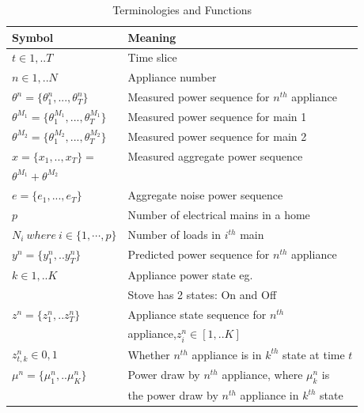 \documentclass[conference]{IEEEtran}
\begin{document}
\begin{table}[ht!]
\vspace{-12pt}
\caption{Terminologies and Functions}
\vspace{-8pt}
\label{tab:terms}
\begin{tabular}{|l|l|}
\hline
Symbol&Meaning\\
\hline
$t\in {1,..T}$& Time slice\\
\hline
$n\in{1,..N}$ & Appliance number\\
\hline
$\theta^n=\{\theta_1^n,...,\theta_T^n\}$ & Measured power sequence for $n^{th}$ appliance\\
\hline
$\theta^{M_1}=\{\theta_1^{M_1},...,\theta_T^{M_1}\}$ & Measured power sequence for main 1\\[0.1cm]
\hline
$\theta^{M_2}=\{\theta_1^{M_2},...,\theta_T^{M_2}\}$ & Measured power sequence for main 2\\[0.1cm]
\hline
$x=\{ x_1,..,x_T\}=$ & Measured aggregate power sequence\\[0.1cm]
$\theta^{M_1}+\theta^{M_2}$ &\\
\hline
$e=\{e_1,...,e_T\}$ & Aggregate noise power sequence\\
\hline
$p$ & Number of electrical mains in a home\\
\hline
$N_i \:where\:i \in \{1,\cdots ,p\}$ & Number of loads in $i^{th}$ main\\
\hline
$y^n=\{y_1^n,..y_T^n\}$ & Predicted power sequence for $n^{th}$ appliance\\[0.1cm]
\hline
$k\in {1,..K}$ & Appliance power state eg. \\
&Stove has 2 states: On and Off\\
\hline
$z^n=\{z_1^n,..z_T^n\}$ & Appliance state sequence for $n^{th}$ \\[0.1cm]
& appliance,$z_i^n \in [1,..K]$\\[0.1cm]
\hline
$z_{t,k}^n \in{0,1}$ & Whether $n^{th}$ appliance is in $k^{th}$ state at time $t$\\[0.1cm]
\hline 
$\mu^n=\{\mu_1^n,..\mu_K^n\}$ & Power draw by $n^{th}$ appliance, where $\mu_k^n$ is\\
&  the power draw by $n^{th}$ appliance in $k^{th}$ state\\[0.1cm]

\end{tabular}
\end{table}
\end{document}
